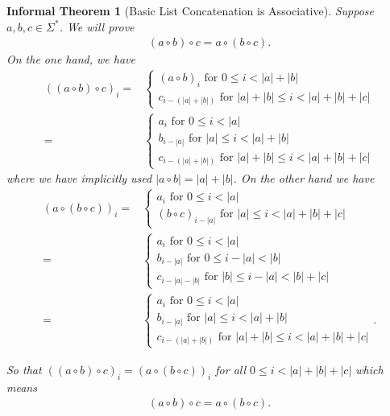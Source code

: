\documentclass[12pt]{article}
\theoremstyle{break}
\theoremstyle{break}
\theoremstyle{break}
\theoremstyle{break}
\theoremstyle{break}
\newtheorem{informal definition}[definition]{Informal Definition}
\theoremstyle{break}
\newtheorem{informal theorem}[theorem]{Informal Theorem}
\begin{document}
	\begin{informal theorem}[Basic List Concatenation is Associative]
		Suppose $a, b, c \in \Sigma^*$. 
		We will prove
		\begin{align*}
			(a \circ b) \circ c = a \circ (b \circ c).
		\end{align*}
		On the one hand, we have
		\begin{align*}
			((a \circ b) \circ c)_i =& \begin{cases}
				(a \circ b)_i \text{ for } 0 \le i < |a| + |b|\\
				c_{i - (|a| + |b|)} \text{ for } |a| + |b| \le i < |a| + |b| + |c|
			\end{cases}\\
			=& \begin{cases}
				a_i \text{ for } 0\le i < |a|\\
				b_{i - |a|} \text{ for } |a| \le i < |a| + |b|\\
				c_{i - (|a| + |b|)} \text{ for } |a| + |b| \le i < |a| + |b| + |c|
			\end{cases}
		\end{align*}
		where we have implicitly used $|a \circ b| = |a| + |b|$.
		On the other hand we have
		\begin{align*}
			(a \circ (b \circ c))_i =& \begin{cases}
				a_i \text{ for } 0 \le i < |a|\\
				(b \circ c)_{i - |a|} \text{ for } |a| \le i < |a| + |b| + |c| 
			\end{cases}\\
			=& \begin{cases}
				a_i \text{ for } 0 \le i < |a|\\
				b_{i - |a|} \text{ for } 0 \le i - |a| < |b|\\
				c_{i - |a| - |b|} \text{ for } |b| \le i - |a| < |b| + |c|\
			\end{cases}\\
			=& \begin{cases}
				a_i \text{ for } 0 \le i < |a|\\
				b_{i - |a|} \text{ for } |a| \le i < |a| + |b|\\
				c_{i - (|a| + |b|)} \text{ for } |a| + |b| \le i < |a| + |b| + |c|
			\end{cases}.
		\end{align*}
		
		So that $((a \circ b) \circ c)_i = (a \circ (b \circ c))_i$ for all $0 \le i < |a| + |b| + |c|$ which means
		\begin{align*}
			(a \circ b) \circ c = a \circ (b \circ c).
		\end{align*}
	\end{informal theorem}
	
\end{document}

